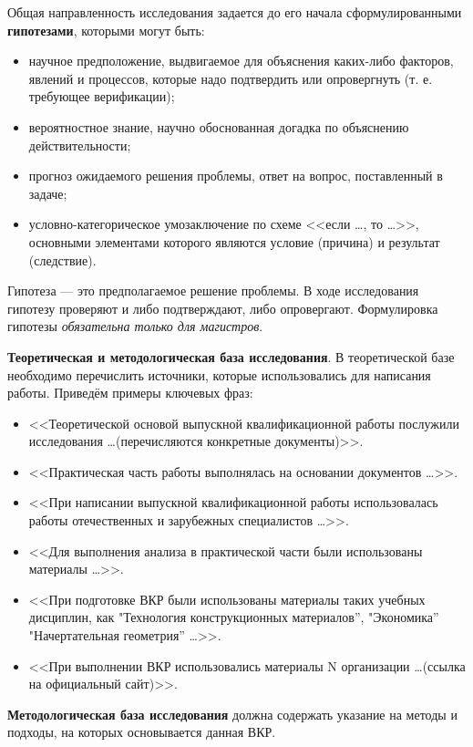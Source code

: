 Общая направленность исследования задается до его начала сформулированными \textbf{гипотезами}, которыми могут быть:
\begin{itemize}
	\item научное предположение, выдвигаемое для объяснения каких-либо факторов, явлений и процессов, которые надо подтвердить или опровергнуть (т. е. требующее верификации);
	\item вероятностное знание, научно обоснованная догадка по объяснению действительности;
	\item прогноз ожидаемого решения проблемы, ответ на вопрос, поставленный в задаче;
	\item условно-категорическое умозаключение по схеме <<если \ldots, то \ldots>>, основными элементами которого являются условие (причина) и результат (следствие).
\end{itemize}  

Гипотеза --- это предполагаемое решение проблемы. В ходе исследования гипотезу проверяют и либо подтверждают, либо опровергают. Формулировка гипотезы \textit{обязательна только для магистров}.


\textbf{Теоретическая и методологическая база исследования}. В теоретической базе необходимо перечислить источники, которые использовались для написания работы. Приведём примеры ключевых фраз: 
\begin{itemize}
	\item <<Теоретической основой выпускной квалификационной работы послужили исследования  \ldots (перечисляются конкретные документы)>>.
	\item <<Практическая часть работы выполнялась на основании документов  \ldots>>.
	\item  <<При написании выпускной квалификационной работы использовалась работы отечественных и зарубежных специалистов \ldots>>.
	\item  <<Для выполнения анализа в практической части были использованы материалы  \ldots>>.
	\item <<При подготовке ВКР были использованы материалы таких учебных дисциплин, как "Технология конструкционных материалов'', "Экономика'' "Начертательная геометрия'' \ldots>>.
	\item <<При выполнении ВКР использовались материалы N организации \ldots (ссылка на официальный сайт)>>.
\end{itemize}

\textbf{Методологическая база исследования} должна содержать указание на методы и подходы, на которых основывается данная ВКР. 


